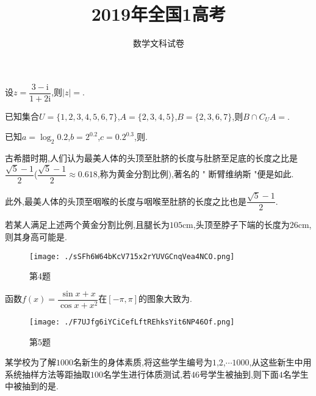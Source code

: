 \documentclass[list]{BHCexam}
\begin{document}
\title{2019年全国1高考}
\subtitle{数学文科试卷}
\date{}
\maketitle
\begin{groups}
\begin{questions}[s]

\question[5] 设$z= \dfrac {3-\mathrm{i}}{1+2\mathrm{i}}$,则$|z|=$.

\question[5] 已知集合$U=\{1 , 2 , 3 , 4 , 5 , 6 , 7\}$,$A=\{2 , 3 , 4 , 5\}$,$B=\{2 , 3 , 6 , 7\}$,则$B \cap  {C}_{U}A =$.

\question[5] 已知$a=\log _{2} 0.2$,$b=2 ^{0.2}$,$c=0.2 ^{0.3}$,则.


	
\question[5] 古希腊时期,人们认为最美人体的头顶至肚脐的长度与肚脐至足底的长度之比是$\dfrac{ \sqrt{5} - 1}{2}$($\dfrac{ \sqrt{5} - 1}{2}  \approx 0.618$,称为黄金分割比例),著名的 " 断臂维纳斯 "便是如此.

此外,最美人体的头顶至咽喉的长度与咽喉至肚脐的长度之比也是$\dfrac{ \sqrt{5} - 1}{2}$.

若某人满足上述两个黄金分割比例,且腿长为$105\text{cm}$,头顶至脖子下端的长度为$26 \text{cm}$,则其身高可能是.


\begin{figure}[H]
    \centering
	\texttt{[image: ./sSFh6W64bKcV715x2rYUVGCnqVea4NCO.png]}
	\caption{第4题}
\end{figure}


\question[5] 函数$f(x)= \dfrac {\sin x+x}{\cos x+x^{2}}$在$[- \pi  ,  \pi ]$的图象大致为.
\fourchoices{}{}{}{}
\begin{figure}[H]
\centering
\texttt{[image: ./F7UJfg6iYCiCefLftREhksYit6NP46Of.png]}
\caption{第5题}
\end{figure}


\question[5] 某学校为了解$1000$名新生的身体素质,将这些学生编号为$1$,$2$,$ \cdots 1000$,从这些新生中用系统抽样方法等距抽取$100$名学生进行体质测试,若$46$号学生被抽到,则下面$4$名学生中被抽到的是.


\end{questions}
\end{groups}
\end{document}
